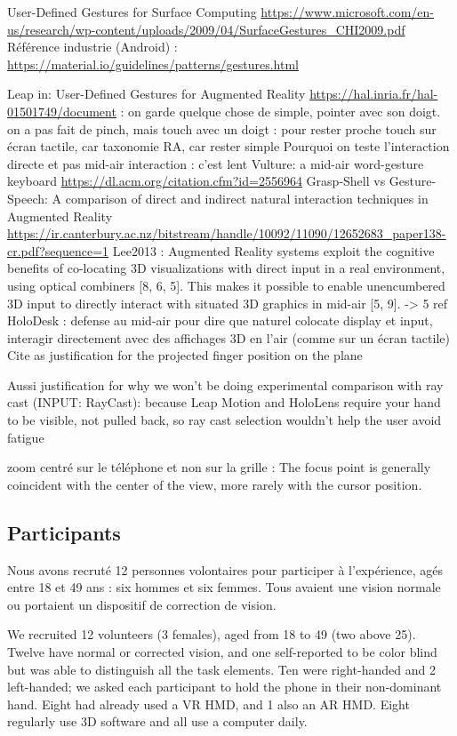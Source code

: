 User-Defined Gestures for Surface Computing \url{https://www.microsoft.com/en-us/research/wp-content/uploads/2009/04/SurfaceGestures_CHI2009.pdf}
Référence industrie (Android) : \url{https://material.io/guidelines/patterns/gestures.html}

Leap in:
User-Defined Gestures for Augmented Reality \url{https://hal.inria.fr/hal-01501749/document} : on garde quelque chose de simple, pointer avec son doigt. on a pas fait de pinch, mais touch avec un doigt : pour rester proche touch sur écran tactile, car taxonomie RA, car rester simple
Pourquoi on teste l'interaction directe et pas mid-air interaction : c'est lent Vulture: a mid-air word-gesture keyboard \url{https://dl.acm.org/citation.cfm?id=2556964}
Grasp-Shell vs Gesture-Speech: A comparison of direct and indirect natural interaction
techniques in Augmented Reality \url{https://ir.canterbury.ac.nz/bitstream/handle/10092/11090/12652683_paper138-cr.pdf?sequence=1}
Lee2013 : Augmented Reality systems exploit the cognitive benefits of co-locating 3D visualizations with direct input in a real environment, using optical combiners [8, 6, 5]. This makes it possible to enable unencumbered 3D input to directly interact with situated 3D graphics in mid-air [5, 9]. -> 5 ref HoloDesk : defense au mid-air pour dire que naturel colocate display et input, interagir directement avec des affichages 3D en l'air (comme sur un écran tactile)
Cite \cite{Chan2010} as justification for the projected finger position on the plane

Aussi justification for why we won’t be doing experimental comparison with ray cast (INPUT: RayCast): because Leap Motion and HoloLens require your hand to be visible, not pulled back, so ray cast selection wouldn’t help the user avoid fatigue

zoom centré sur le téléphone et non sur la grille : The focus point is generally coincident with the center of the view, more rarely with the cursor position. \cite{Guiard2004}


\subsection{Participants}
\label{subsec:experiment_participants}
Nous avons recruté 12 personnes volontaires pour participer à l'expérience, agés entre 18 et 49 ans : six hommes et six femmes. Tous avaient une vision normale ou portaient un dispositif de correction de vision.

We recruited 12 volunteers (3 females), aged from 18 to 49 (two above 25). Twelve have normal or corrected vision, and one self-reported to be color blind but was able to distinguish all the task elements. Ten were right-handed and 2 left-handed; we asked each participant to hold the phone in their non-dominant hand. Eight had already used a VR HMD, and 1 also an AR HMD. Eight regularly use 3D software and all use a computer daily.


